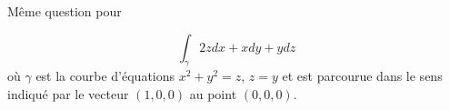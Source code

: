 
\begin{exercice}\label{exoVariete0019}

Même question pour 

\[\int_\gamma 2zdx+xdy+ydz\] où $\gamma$ est  la courbe d'équations $x^2+y^2=z$, $z=y$ et est parcourue dans le sens indiqué par le vecteur $(1,0,0)$ au point $(0,0,0)$.


\end{exercice}
